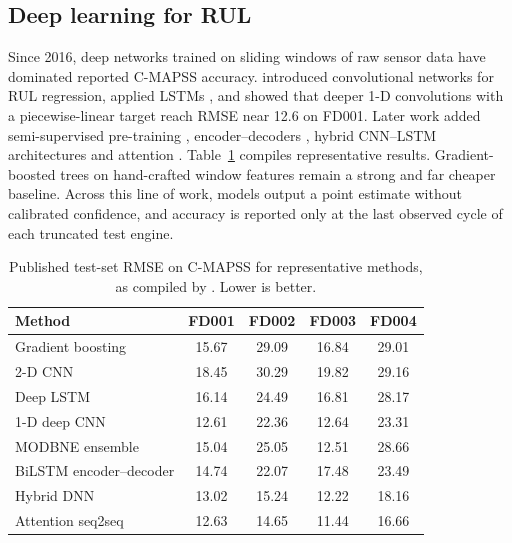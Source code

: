 \documentclass[preprint,12pt,authoryear]{elsarticle}
\newcommand{\botrule}{\bottomrule}
\begin{document}
\subsection{Deep learning for RUL}
Since 2016, deep networks trained on sliding windows of raw sensor data have dominated reported C-MAPSS accuracy. \citet{babu2016cnn} introduced convolutional networks for RUL regression, \citet{zheng2017lstm} applied LSTMs \citep{hochreiter1997lstm}, and \citet{li2018dcnn} showed that deeper 1-D convolutions with a piecewise-linear target reach RMSE near 12.6 on FD001. Later work added semi-supervised pre-training \citep{listou2019semisup}, encoder--decoders \citep{yu2019bilstmed}, hybrid CNN--LSTM architectures \citep{aldulaimi2019hdnn} and attention \citep{ragab2020ats2s}. Table~\ref{tab:literature} compiles representative results. Gradient-boosted trees \citep{friedman2001gbm,ke2017lightgbm} on hand-crafted window features remain a strong and far cheaper baseline. Across this line of work, models output a point estimate without calibrated confidence, and accuracy is reported only at the last observed cycle of each truncated test engine.

\begin{table}[t]
\caption{Published test-set RMSE on C-MAPSS for representative methods, as compiled by \citet{ragab2020ats2s}. Lower is better.}\label{tab:literature}
\begin{tabular*}{\textwidth}{@{\extracolsep\fill}lcccc}
\toprule
Method & FD001 & FD002 & FD003 & FD004 \\
\midrule
Gradient boosting \citep{zhang2016modbne}  & 15.67 & 29.09 & 16.84 & 29.01 \\
2-D CNN \citep{babu2016cnn}               & 18.45 & 30.29 & 19.82 & 29.16 \\
Deep LSTM \citep{zheng2017lstm}           & 16.14 & 24.49 & 16.81 & 28.17 \\
1-D deep CNN \citep{li2018dcnn}           & 12.61 & 22.36 & 12.64 & 23.31 \\
MODBNE ensemble \citep{zhang2016modbne}   & 15.04 & 25.05 & 12.51 & 28.66 \\
BiLSTM encoder--decoder \citep{yu2019bilstmed} & 14.74 & 22.07 & 17.48 & 23.49 \\
Hybrid DNN \citep{aldulaimi2019hdnn}      & 13.02 & 15.24 & 12.22 & 18.16 \\
Attention seq2seq \citep{ragab2020ats2s}  & 12.63 & 14.65 & 11.44 & 16.66 \\
\botrule
\end{tabular*}
\end{table}
\end{document}
